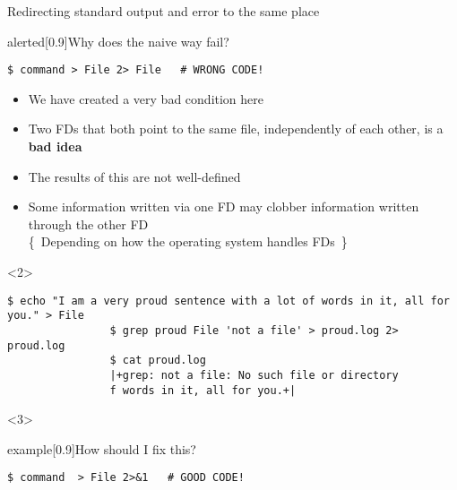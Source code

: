 \begin{frame}[fragile]{Redirecting standard output and error to the same place}
    \vspace{-7mm}
    \begin{overlayarea}{\textwidth}{0.5\textheight}
        \begin{varblock}{alerted}[0.9\textwidth]{Why does the naive way fail?}
            \begin{lstlisting}[style=MyBash, numbers=none, aboveskip=2mm, belowskip=-5mm]
                $ command > File 2> File   # WRONG CODE!
            \end{lstlisting}
        \end{varblock}
        \begin{itemize}[<only@1>]
            \item We have created a very bad condition here
            \item Two FDs that both point to the same file, independently of each other, is a \textbf{bad idea}
            \item The results of this are not well-defined
            \item Some information written via one FD may clobber information written through the other FD\\[-0.5em]
                  {\tiny \{~Depending on how the operating system handles FDs~\}}
        \end{itemize}
        \begin{onlyenv}<2>
            \begin{lstlisting}[style=MyBash, numbers=none, aboveskip=0pt]
                $ echo "I am a very proud sentence with a lot of words in it, all for you." > File
                $ grep proud File 'not a file' > proud.log 2> proud.log
                $ cat proud.log
                |+grep: not a file: No such file or directory
                f words in it, all for you.+|
            \end{lstlisting}
        \end{onlyenv}
        \begin{onlyenv}<3>
            \vspace{-2mm}
            \begin{varblock}{example}[0.9\textwidth]{How should I fix this?}
                \begin{lstlisting}[style=MyBash, numbers=none, aboveskip=2mm, belowskip=-5mm, xleftmargin=3mm, xrightmargin=3mm]
                    $ command  > File 2>&1   # GOOD CODE!

\end{lstlisting}
\end{varblock}
\end{onlyenv}
\end{overlayarea}
\end{frame}
